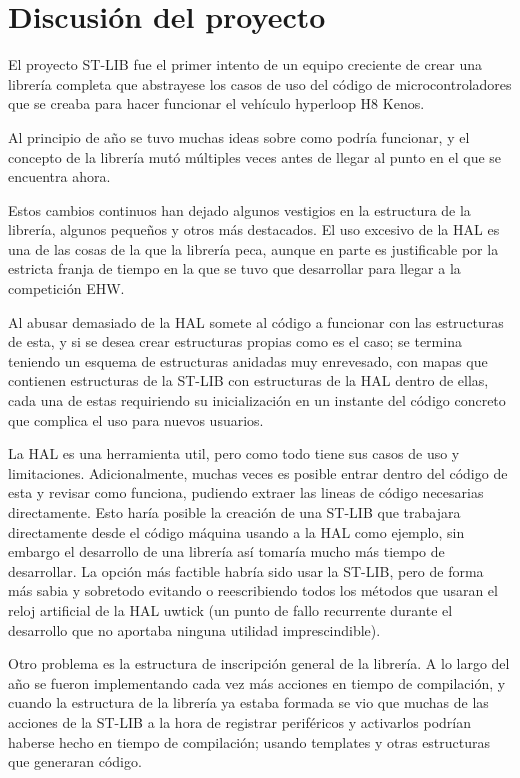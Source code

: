 \documentclass{report}
\begin{document}
\section{Discusión del proyecto}
El proyecto ST-LIB fue el primer intento de un equipo creciente de crear una librería completa que abstrayese los casos de uso del código de microcontroladores que se creaba para hacer funcionar el vehículo hyperloop H8 Kenos. \par
Al principio de año se tuvo muchas ideas sobre como podría funcionar, y el concepto de la librería mutó múltiples veces antes de llegar al punto en el que se encuentra ahora. \par \vspace{0.3cm}
Estos cambios continuos han dejado algunos vestigios en la estructura de la librería, algunos pequeños y otros más destacados. 
El uso excesivo de la HAL es una de las cosas de la que la librería peca, aunque en parte es justificable por la estricta franja de tiempo en la que se tuvo que desarrollar para llegar a la competición EHW. 
\par
Al abusar demasiado de la HAL somete al código a funcionar con las estructuras de esta, y si se desea crear estructuras propias como es el caso; se termina teniendo un esquema de estructuras anidadas muy enrevesado, con mapas que contienen estructuras de la ST-LIB con estructuras de la HAL dentro de ellas, cada una de estas requiriendo su inicialización en un instante del código concreto que complica el uso para nuevos usuarios. 
\par
La HAL es una herramienta util, pero como todo tiene sus casos de uso y limitaciones. Adicionalmente, muchas veces es posible entrar dentro del código de esta y revisar como funciona, pudiendo extraer las lineas de código necesarias directamente. Esto haría posible la creación de una ST-LIB que trabajara directamente desde el código máquina usando a la HAL como ejemplo, sin embargo el desarrollo de una librería así tomaría mucho más tiempo de desarrollar. La opción más factible habría sido usar la ST-LIB, pero de forma más sabia y sobretodo evitando o reescribiendo todos los métodos que usaran el reloj artificial de la HAL uwtick (un punto de fallo recurrente durante el desarrollo que no aportaba ninguna utilidad imprescindible). 
\par \vspace{0.3cm}
Otro problema es la estructura de inscripción general de la librería. A lo largo del año se fueron implementando cada vez más acciones en tiempo de compilación, y cuando la estructura de la librería ya estaba formada se vio que muchas de las acciones de la ST-LIB a la hora de registrar periféricos y activarlos podrían haberse hecho en tiempo de compilación; usando templates y otras estructuras que generaran código. \par
\end{document}
